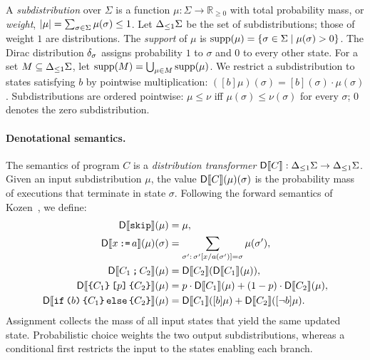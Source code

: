 A \emph{subdistribution} over $\Sigma$ is a function
$\mu:\Sigma\to\mathbb R_{\geq0}$ with total probability mass, or
\emph{weight}, $|\mu|=\sum_{\sigma\in\Sigma}\mu(\sigma)\leq1$.
Let ${\Delta_{\leq 1} \Sigma}$ be the set of subdistributions; those of weight $1$
are distributions. The \emph{support} of $\mu$ is
$\textnormal{supp}(\mu)=\{\sigma\in\Sigma\mid\mu(\sigma)>0\}$.
The Dirac distribution $\delta_{\sigma}$ assigns probability $1$ to
$\sigma$ and $0$ to every other state. For a set
$M\subseteq{\Delta_{\leq 1}\Sigma}$, let
$\textnormal{supp}(M)=\bigcup_{\mu\in M}\textnormal{supp}(\mu)$.
We restrict a subdistribution to states satisfying $b$ by pointwise
multiplication: $([b]\mu)(\sigma)=[b](\sigma) \cdot \mu(\sigma)$.
Subdistributions are ordered pointwise:
$\mu\leq\nu$ iff $\mu(\sigma)\leq\nu(\sigma)$ for every $\sigma$;
$0$ denotes the zero subdistribution.

\paragraph{Denotational semantics.}
The semantics of program $C$ is a \emph{distribution transformer}
$\mathsf{D}\llbracket C\rrbracket:{\Delta_{\leq 1} \Sigma}\to{\Delta_{\leq 1}\Sigma}$.
Given an input subdistribution $\mu$, the value
$\mathsf{D}\llbracket C\rrbracket(\mu)(\sigma)$ is the probability mass of executions that
terminate in state $\sigma$. Following the forward semantics of
Kozen~\cite{DBLP:conf/focs/Kozen79,DBLP:conf/stoc/Kozen83}, we define:
\begin{align*}
 \mathsf{D}\llbracket \textnormal{\texttt{skip}}\rrbracket(\mu)&=\mu,\\
 \mathsf{D}\llbracket x\,\textnormal{\texttt{:=}}\, a\rrbracket(\mu)(\sigma)
   &=\sum_{\sigma':\,\sigma'[x/a(\sigma')]=\sigma}\mu(\sigma'),\\
 \mathsf{D}\llbracket C_1\,\textnormal{\texttt{;}}\, C_2\rrbracket(\mu)
   &=\mathsf{D}\llbracket C_2\rrbracket(\mathsf{D}\llbracket C_1\rrbracket(\mu)),\\
 \mathsf{D}\llbracket \textnormal{\texttt{\{}} C_1\textnormal{\texttt{\}}} \, \textnormal{\texttt{[}} p\textnormal{\texttt{]}} \, \textnormal{\texttt{\{}} C_2\textnormal{\texttt{\}}}\rrbracket(\mu)
   &=p \cdot \mathsf{D}\llbracket C_1\rrbracket(\mu)+(1-p)\cdot \mathsf{D}\llbracket C_2\rrbracket(\mu),\\
 \mathsf{D}\llbracket \textnormal{\texttt{if}}\,\textnormal{\texttt{(}} b\textnormal{\texttt{)}}\,\textnormal{\texttt{\{}} C_1\textnormal{\texttt{\}}}\,\textnormal{\texttt{else}}\,\textnormal{\texttt{\{}} C_2\textnormal{\texttt{\}}}\rrbracket(\mu)
   &=\mathsf{D}\llbracket C_1\rrbracket([b]\mu)+\mathsf{D}\llbracket C_2\rrbracket([\neg b]\mu).
\end{align*}
Assignment collects the mass of all input states that yield the same
updated state. Probabilistic choice weights the two output
subdistributions, whereas a conditional first restricts the input
to the states enabling each branch.

